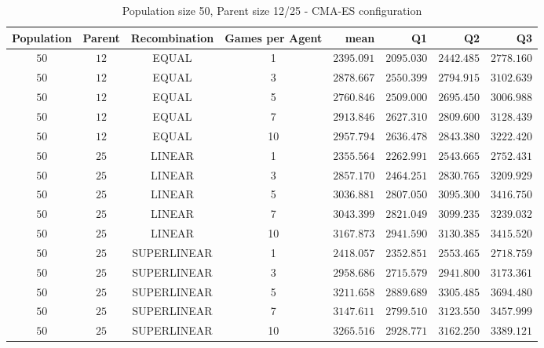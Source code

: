 \begin{table}[H]
\centering
\small
\begin{tabular}{c c c c r r r r}
Population & Parent & Recombination & Games per Agent & mean & Q1 & Q2 & Q3\\
\hline
$50$ & $12$ & EQUAL & 1 & $2395.091$ & $2095.030$ & $2442.485$ & $2778.160$\\
$50$ & $12$ & EQUAL & 3 & $2878.667$ & $2550.399$ & $2794.915$ & $3102.639$\\
$50$ & $12$ & EQUAL & 5 & $2760.846$ & $2509.000$ & $2695.450$ & $3006.988$\\
$50$ & $12$ & EQUAL & 7 & $2913.846$ & $2627.310$ & $2809.600$ & $3128.439$\\
\hdashline
$50$ & $12$ & EQUAL & 10 & $2957.794$ & $2636.478$ & $2843.380$ & $3222.420$\\
\hdashline
$50$ & $25$ & LINEAR & 1 & $2355.564$ & $2262.991$ & $2543.665$ & $2752.431$\\
$50$ & $25$ & LINEAR & 3 & $2857.170$ & $2464.251$ & $2830.765$ & $3209.929$\\
$50$ & $25$ & LINEAR & 5 & $3036.881$ & $2807.050$ & $3095.300$ & $3416.750$\\
$50$ & $25$ & LINEAR & 7 & $3043.399$ & $2821.049$ & $3099.235$ & $3239.032$\\
\hdashline
$50$ & $25$ & LINEAR & 10 & $3167.873$ & $2941.590$ & $3130.385$ & $3415.520$\\
\hdashline
$50$ & $25$ & SUPERLINEAR & 1 & $2418.057$ & $2352.851$ & $2553.465$ & $2718.759$\\
$50$ & $25$ & SUPERLINEAR & 3 & $2958.686$ & $2715.579$ & $2941.800$ & $3173.361$\\
\hdashline
$50$ & $25$ & SUPERLINEAR & 5 & $3211.658$ & $2889.689$ & $3305.485$ & $3694.480$\\
\hdashline
$50$ & $25$ & SUPERLINEAR & 7 & $3147.611$ & $2799.510$ & $3123.550$ & $3457.999$\\
$50$ & $25$ & SUPERLINEAR & 10 & $3265.516$ & $2928.771$ & $3162.250$ & $3389.121$\\
\end{tabular}
\caption{Population size 50, Parent size 12/25 - CMA-ES configuration}
\end{table}



